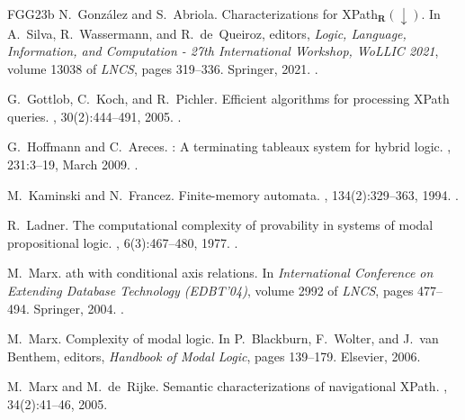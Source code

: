 \documentclass[10pt,a4paper]{amsart}
\theoremstyle{definition}
\theoremstyle{remark}
\begin{document}
\begin{thebibliography}{FGG{\etalchar{+}}23b}
N.~Gonz{\'{a}}lez and S.~Abriola.
\newblock Characterizations for {XP}ath$_\mathbf{R}(\downarrow)$.
\newblock In A.~Silva, R.~Wassermann, and R.~de~Queiroz, editors, {\em Logic, Language, Information, and Computation - 27th International Workshop, WoLLIC 2021}, volume 13038 of {\em LNCS}, pages 319--336. Springer, 2021.
\newblock \href {https://doi.org/10.1007/978-3-030-88853-4\_20} {}.

G.~Gottlob, C.~Koch, and R.~Pichler.
\newblock Efficient algorithms for processing {{XP}ath} queries.
, 30(2):444--491, 2005.
\newblock \href {https://doi.org/10.1145/1071610.1071614} {}.

G.~Hoffmann and C.~Areces.
: A terminating tableaux system for hybrid logic.
, 231:3--19, March 2009.
\newblock \href {https://doi.org/10.1016/j.entcs.2009.02.026} {}.

M.~Kaminski and N.~Francez.
\newblock Finite-memory automata.
, 134(2):329--363, 1994.
\newblock \href {https://doi.org/10.1016/0304-3975(94)90242-9} {}.

R.~Ladner.
\newblock The computational complexity of provability in systems of modal propositional logic.
, 6(3):467--480, 1977.
\newblock \href {https://doi.org/10.1137/0206033} {}.

M.~Marx.
ath with conditional axis relations.
\newblock In {\em International Conference on Extending Database Technology (EDBT'04)}, volume 2992 of {\em LNCS}, pages 477--494. Springer, 2004.
\newblock \href {https://doi.org/10.1007/b95855} {}.

M.~Marx.
\newblock Complexity of modal logic.
\newblock In P.~Blackburn, F.~Wolter, and J.~van Benthem, editors, {\em Handbook of Modal Logic}, pages 139--179. Elsevier, 2006.

M.~Marx and M.~de~Rijke.
\newblock Semantic characterizations of navigational {XP}ath.
, 34(2):41--46, 2005.


\end{thebibliography}
\end{document}
